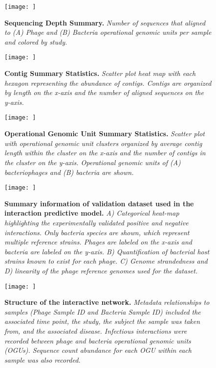 \documentclass[12pt,]{article}
\newcommand{\beginsupplement}{%
        \setcounter{table}{0}
        \renewcommand{\thetable}{S\arabic{table}}%
        \setcounter{figure}{0}
        \renewcommand{\thefigure}{S\arabic{figure}}%
     }
\begin{document}
\beginsupplement

\begin{figure}[htbp]
\centering
\texttt{[image: ]}
\caption{\textbf{Sequencing Depth Summary.} \emph{Number of sequences
that aligned to (A) Phage and (B) Bacteria operational genomic units per
sample and colored by study.}\label{SequenceStats}}
\end{figure}

\newpage

\begin{figure}[htbp]
\centering
\texttt{[image: ]}
\caption{\textbf{Contig Summary Statistics.} \emph{Scatter plot heat map
with each hexagon representing the abundance of contigs. Contigs are
organized by length on the x-axis and the number of aligned sequences on
the y-axis.}\label{ContigStats}}
\end{figure}

\newpage

\begin{figure}[htbp]
\centering
\texttt{[image: ]}
\caption{\textbf{Operational Genomic Unit Summary Statistics.}
\emph{Scatter plot with operational genomic unit clusters organized by
average contig length within the cluster on the x-axis and the number of
contigs in the cluster on the y-axis. Operational genomic units of (A)
bacteriophages and (B) bacteria are shown.}\label{ClusterStats}}
\end{figure}

\newpage

\begin{figure}[htbp]
\centering
\texttt{[image: ]}
\caption{\textbf{Summary information of validation dataset used in the
interaction predictive model.} \emph{A) Categorical heat-map
highlighting the experimentally validated positive and negative
interactions. Only bacteria species are shown, which represent multiple
reference strains. Phages are labeled on the x-axis and bacteria are
labeled on the y-axis. B) Quantification of bacterial host strains known
to exist for each phage. C) Genome strandedness and D) linearity of the
phage reference genomes used for the
dataset.}\label{ValidationOverview}}
\end{figure}

\newpage

\begin{figure}[htbp]
\centering
\texttt{[image: ]}
\caption{\textbf{Structure of the interactive network.} \emph{Metadata
relationships to samples (Phage Sample ID and Bacteria Sample ID)
included the associated time point, the study, the subject the sample
was taken from, and the associated disease. Infectious interactions were
recorded between phage and bacteria operational genomic units (OGUs).
Sequence count abundance for each OGU within each sample was also
recorded.}\label{NetworkDiagram}}
\end{figure}
\end{document}
